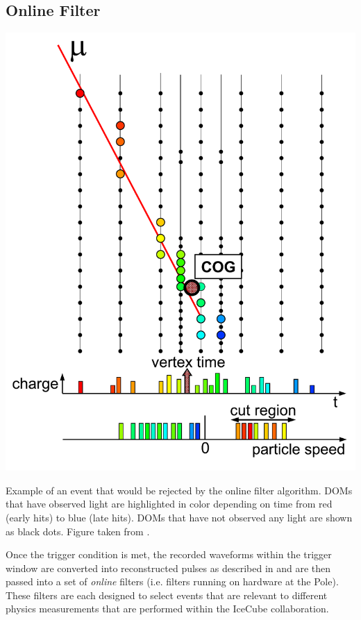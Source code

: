\subsection{Online Filter}
\begin{marginfigure}
    \includegraphics[width=\textwidth]{figures/icecube/eventviews/FilterDiagram.pdf}
    \caption{Example of an event that would be rejected by the online filter algorithm. DOMs that have observed light are highlighted in color depending on time from red (early hits) to blue (late hits). DOMs that have not observed any light are shown as black dots. Figure taken from \cite{DeepCore}.}
    \label{fig:online-filter-event}
\end{marginfigure}
Once the trigger condition is met, the recorded waveforms within the trigger window are converted into reconstructed pulses as described in  and are then passed into a set of \emph{online} filters (i.e. filters running on hardware at the Pole).
These filters are each designed to select events that are relevant to different physics measurements that are performed within the IceCube collaboration.

